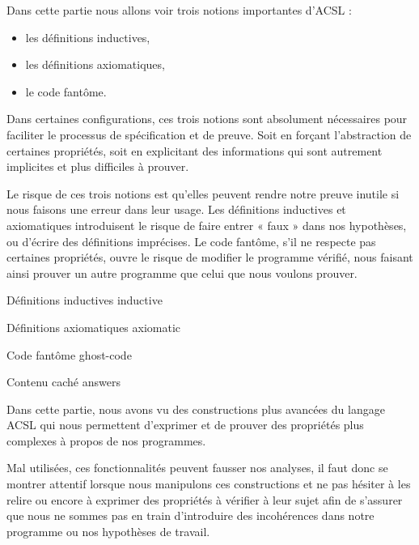 Dans cette partie nous allons voir trois notions importantes d'ACSL :



\begin{itemize}
\item les définitions inductives,
\item les définitions axiomatiques,
\item le code fantôme.
\end{itemize}


Dans certaines configurations, ces trois notions sont absolument nécessaires
pour faciliter le processus de spécification et de preuve. Soit en forçant
l'abstraction de certaines propriétés, soit en explicitant des informations qui
sont autrement implicites et plus difficiles à prouver.



Le risque de ces trois notions est qu'elles peuvent rendre notre preuve inutile
si nous faisons une erreur dans leur usage. Les définitions inductives et
axiomatiques introduisent le risque de faire entrer « faux » dans nos
hypothèses, ou d'écrire des définitions imprécises. Le code fantôme, s'il ne
respecte pas certaines propriétés, ouvre le risque de modifier le programme
vérifié, nous faisant ainsi prouver un autre programme que celui que nous
voulons prouver.


\begin{levelTwo}
  {Définitions inductives}
  {inductive}
\end{levelTwo}


\begin{levelTwo}
  {Définitions axiomatiques}
  {axiomatic}
\end{levelTwo}


\begin{levelTwo}
  {Code fantôme}
  {ghost-code}
\end{levelTwo}


\begin{levelTwo}
  {Contenu caché}
  {answers}
\end{levelTwo}


\horizontalLine
\newpage


Dans cette partie, nous avons vu des constructions plus avancées du langage ACSL
qui nous permettent d'exprimer et de prouver des propriétés plus complexes à
propos de nos programmes.



Mal utilisées, ces fonctionnalités peuvent fausser nos analyses, il faut donc se
montrer attentif lorsque nous manipulons ces constructions et ne pas hésiter à
les relire ou encore à exprimer des propriétés à vérifier à leur sujet afin de
s'assurer que nous ne sommes pas en train d'introduire des incohérences dans
notre programme ou nos hypothèses de travail.
